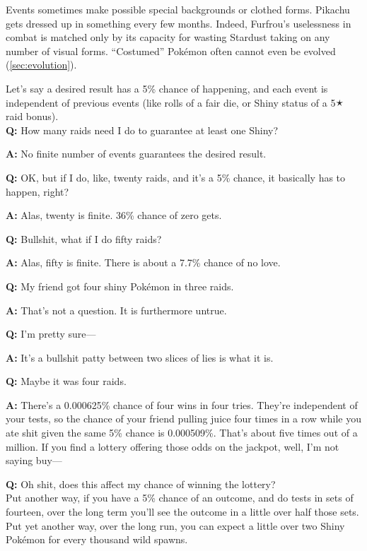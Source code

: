 Events sometimes make possible special backgrounds or clothed forms.
Pikachu gets dressed up in something every few months.
Indeed, Furfrou's uselessness in combat is matched only by its
  capacity for wasting Stardust taking on any number of visual forms.
``Costumed'' Pokémon often cannot even be evolved (\autoref{sec:evolution}).
\begin{tcolorbox}[enhanced,title=An aside regarding independent events,halign title=flush center]
Let's say a desired result has a 5\% chance of happening, and each event is independent of previous events (like rolls of a fair die, or Shiny status of a 5🟉 raid bonus).\\

\textbf{Q:} How many raids need I do to guarantee at least one Shiny?

\textbf{A:} No finite number of events guarantees the desired result.

\textbf{Q:} OK, but if I do, like, twenty raids, and it's a 5\% chance, it basically has to happen, right?

\textbf{A:} Alas, twenty is finite. 36\% chance of zero gets.

\textbf{Q:} Bullshit, what if I do fifty raids?

\textbf{A:} Alas, fifty is finite. There is about a 7.7\% chance of no love.

\textbf{Q:} My friend got four shiny Pokémon in three raids.

\textbf{A:} That's not a question. It is furthermore untrue.

\textbf{Q:} I'm pretty sure---

\textbf{A:} It's a bullshit patty between two slices of lies is what it is.

\textbf{Q:} Maybe it was four raids.

\textbf{A:} There's a 0.000625\% chance of four wins in four tries. They're independent of your tests,
             so the chance of your friend pulling juice four times in a row while you ate shit given
             the same 5\% chance is 0.000509\%. That's about five times out of a million.
             If you find a lottery offering those odds on the jackpot, well, I'm not saying buy---

\textbf{Q:} Oh shit, does this affect my chance of winning the lottery?\\

Put another way, if you have a 5\% chance of an outcome, and do tests in sets of fourteen,
 over the long term you'll see the outcome in a little over half those sets.
Put yet another way, over the long run, you can expect a little over two Shiny
 Pokémon for every thousand wild spawns.\\


\end{tcolorbox}
